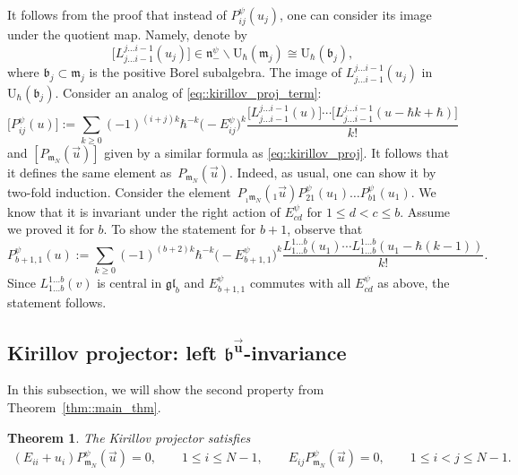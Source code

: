 \documentclass[10pt,a4paper]{article}
\numberwithin{equation}{section}
\newtheorem{Theorem}{Theorem}[section]
\newcommand{\U}{\mathrm{U}_{\hbar}}
\renewcommand{\b}{\mathfrak{b}}
\newcommand{\n}{\mathfrak{n}}
\newcommand{\m}{\mathfrak{m}}
\newcommand{\gl}{\mathfrak{gl}}
\begin{document}
	\begin{Remark}
		\label{rmk::kirillov_proj_image_quot}
		It follows from the proof that instead of $P_{ij}^{\psi}(u_j)$, one can consider its image under the quotient map. Namely, denote by
		\[
		\bigl[L_{j \dots i-1}^{j \dots i-1}(u_j)\bigr] \in \n_-^{\psi} \backslash \U(\m_j) \cong \U(\b_j),
		\]
		where $\b_j \subset \m_j$ is the positive Borel subalgebra. The image of $L_{j \dots i-1}^{j \dots i-1}(u_j)$ in $\U(\b_j)$. Consider an analog of \eqref{eq::kirillov_proj_term}:
		\begin{equation*}
			\bigl[P^{\psi}_{ij}(u)\bigr] := \sum\limits_{k\geq 0} (-1)^{(i+j)k} \hbar^{-k} \bigl(-E_{ij}^{\psi}\bigr)^k \frac{\bigl[L_{j\dots i-1}^{j \dots i-1}(u)\bigr] \cdots \bigl[L_{j\dots i-1}^{j \dots i-1}(u - \hbar k+\hbar)\bigr]}{k!}
		\end{equation*}
		and $[P_{\m_N}(\vec{u})]$ given by a similar formula as \eqref{eq::kirillov_proj}. It follows that it defines the same element as~$P_{\m_N}(\vec{u})$. Indeed, as usual, one can show it by two-fold induction. Consider the element~${
		P_{{}_1\m_N}({}_1\vec{u}) P_{21}^{\psi}(u_1) \dots P_{b1}^{\psi}(u_1)}$.
		We know that it is invariant under the right action of $E_{cd}^{\psi}$ for $1\leq d < c \leq b$. Assume we proved it for $b$. To show the statement for $b+1$, observe that
		\[
		P^{\psi}_{b+1,1}(u) := \sum\limits_{k\geq 0} (-1)^{(b+2)k} \hbar^{-k} \bigl(-E_{b+1,1}^{\psi}\bigr)^k \frac{L_{1\dots b}^{1 \dots b}(u_1) \cdots L_{1\dots b}^{1 \dots b}(u_1 - \hbar(k-1))}{k!}.
		\]
		Since $L_{1\dots b}^{1\dots b}(v)$ is central in $\gl_b$ and $E_{b+1,1}^{\psi}$ commutes with all $E_{cd}^{\psi}$ as above, the statement follows.
	\end{Remark}
	
	\subsection[Kirillov projector: left b-invariance]{Kirillov projector: left $\boldsymbol{\b^{\vec{u}}}$-invariance}
	
	In this subsection, we will show the second property from Theorem~\ref{thm::main_thm}.
	\begin{Theorem}
		\label{thm::proj_left_inv}
		The Kirillov projector satisfies
		\begin{gather*}
				(E_{ii} + u_i) P_{\m_N}^{\psi}(\vec{u}) = 0,\qquad 1\leq i \leq N-1, \qquad
				E_{ij} P_{\m_N}^{\psi}(\vec{u}) =0,\qquad 1 \leq i < j \leq N-1.
		\end{gather*}
	\end{Theorem}
	
\end{document}
